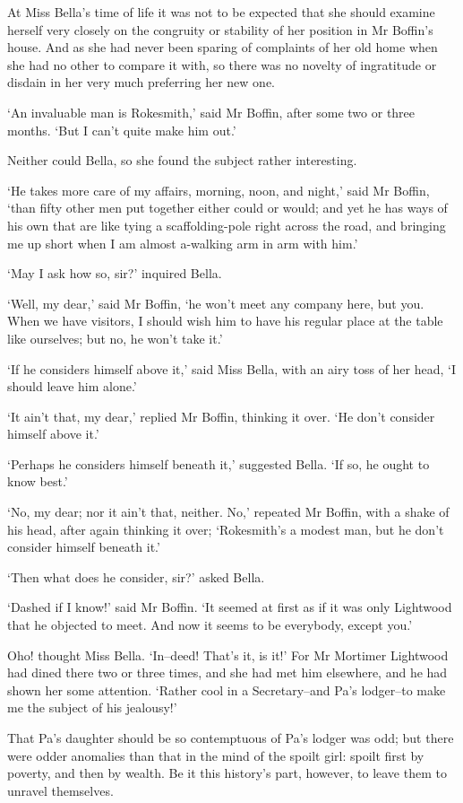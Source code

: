 At Miss Bella’s time of life it was not to be expected that she should
examine herself very closely on the congruity or stability of her
position in Mr Boffin’s house. And as she had never been sparing of
complaints of her old home when she had no other to compare it with,
so there was no novelty of ingratitude or disdain in her very much
preferring her new one.

‘An invaluable man is Rokesmith,’ said Mr Boffin, after some two or
three months. ‘But I can’t quite make him out.’

Neither could Bella, so she found the subject rather interesting.

‘He takes more care of my affairs, morning, noon, and night,’ said Mr
Boffin, ‘than fifty other men put together either could or would; and
yet he has ways of his own that are like tying a scaffolding-pole right
across the road, and bringing me up short when I am almost a-walking arm
in arm with him.’

‘May I ask how so, sir?’ inquired Bella.

‘Well, my dear,’ said Mr Boffin, ‘he won’t meet any company here, but
you. When we have visitors, I should wish him to have his regular place
at the table like ourselves; but no, he won’t take it.’

‘If he considers himself above it,’ said Miss Bella, with an airy toss
of her head, ‘I should leave him alone.’

‘It ain’t that, my dear,’ replied Mr Boffin, thinking it over. ‘He don’t
consider himself above it.’

‘Perhaps he considers himself beneath it,’ suggested Bella. ‘If so, he
ought to know best.’

‘No, my dear; nor it ain’t that, neither. No,’ repeated Mr Boffin, with
a shake of his head, after again thinking it over; ‘Rokesmith’s a modest
man, but he don’t consider himself beneath it.’

‘Then what does he consider, sir?’ asked Bella.

‘Dashed if I know!’ said Mr Boffin. ‘It seemed at first as if it
was only Lightwood that he objected to meet. And now it seems to be
everybody, except you.’

Oho! thought Miss Bella. ‘In--deed! That’s it, is it!’ For Mr Mortimer
Lightwood had dined there two or three times, and she had met him
elsewhere, and he had shown her some attention. ‘Rather cool in a
Secretary--and Pa’s lodger--to make me the subject of his jealousy!’

That Pa’s daughter should be so contemptuous of Pa’s lodger was odd;
but there were odder anomalies than that in the mind of the spoilt girl:
spoilt first by poverty, and then by wealth. Be it this history’s part,
however, to leave them to unravel themselves.

